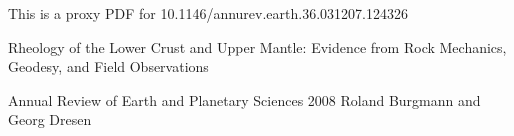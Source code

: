 \documentclass[letterpaper]{article}
\begin{document}
 
This is a proxy PDF for 10.1146/annurev.earth.36.031207.124326

Rheology of the Lower Crust and Upper Mantle: Evidence from Rock Mechanics, Geodesy, and Field Observations

Annual Review of Earth and Planetary Sciences 2008
Roland Burgmann and Georg Dresen
\end{document}
